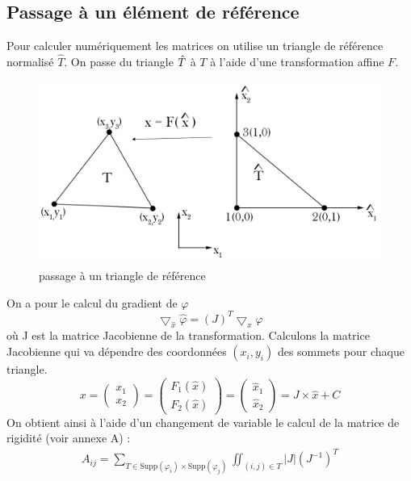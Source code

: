 \documentclass[a4paper,12pt,titlepage]{report}
\begin{document}
\begin{onehalfspace}
\subsection{Passage à un élément de référence}
Pour calculer numériquement les matrices on utilise un triangle de référence normalisé $\hat{T}$. On passe du triangle $\Hat{T}$ à $T$ à l'aide d'une transformation affine $F$. \\
\begin{figure}[h!]
\begin{center}
\includegraphics[height = 6cm, keepaspectratio]{graphes/transformation_de_maillage.png} 
\caption{\label{figure 4 } passage à un triangle de référence}
\end{center}
\end{figure}
\newline
On a pour le calcul du gradient de $\varphi$
\[ \bigtriangledown_{\hat{x}} \hat{\varphi} = (J)^{T} \bigtriangledown_{x} \varphi  \]
où J est la matrice Jacobienne de la transformation.
Calculons la matrice Jacobienne qui va dépendre des coordonnées $(x_{i},y_{i})$ des sommets pour chaque triangle.
\[
x = \begin{pmatrix}
   x_{1} \\
   x_{2} 
\end{pmatrix}
= \begin{pmatrix}
   F_{1}(\hat{x}) \\
   F_{2}(\hat{x}) 
\end{pmatrix}
= \begin{pmatrix}
   \hat{x}_{1} \\
   \hat{x}_{2} 
\end{pmatrix}
= J \times \hat{x} + C
\]
On obtient ainsi à l'aide d'un changement de variable le calcul de la matrice de rigidité (voir annexe A) : 
\[
\boxed{
\begin{aligned}
A_{ij} = 
	\sum_{T \in \text{Supp}(\varphi_{i})\times \text{Supp}(\varphi_{j})}
	\iint_{(i,j) \in T} |J|(J^{-1})^{T}

\end{aligned}}\]
\end{onehalfspace}
\end{document}
